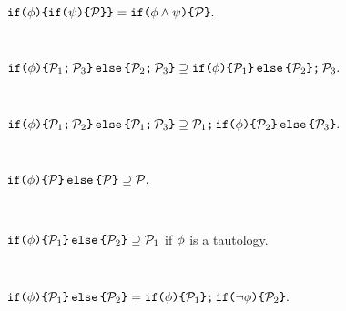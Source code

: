 \begin{lemma}
  \label{lem:if}

  \begin{enumerate*}[label=(\alph*),ref=\alph*]
    \setcounter{enumi}{3}
    \item \label{lem:if:if}
    \begin{math}
      \xIFTHEN{\aForm}{
        \xIFTHEN{\bForm}{\aPSS}{}
      }{}
      =
      \xIFTHEN{\aForm\land\bForm}{\aPSS}{}.
    \end{math}

  \\\item \label{lem:if:seq}
    \begin{math}
      \xIFTHEN{\aForm}{
        \xSEMI{\aPSS_1}{\aPSS_3}
      }{
        \xSEMI{\aPSS_2}{\aPSS_3}
      }
      \supseteq
      \xSEMI{
        \xIFTHEN{\aForm}{\aPSS_1}{\aPSS_2}
      }{
        \aPSS_3
      }.
    \end{math}

  \\\item \label{lem:seq:if}
    \begin{math}
      \xIFTHEN{\aForm}{
        \xSEMI{\aPSS_1}{\aPSS_2}
      }{
        \xSEMI{\aPSS_1}{\aPSS_3}
      }
      \supseteq
      \xSEMI{
        \aPSS_1
      }{
        \xIFTHEN{\aForm}{\aPSS_2}{\aPSS_3}
      }.
    \end{math}

  \\\item \label{lem:if:elim}
    \begin{math}
      \xIFTHEN{\aForm}{\aPSS}{\aPSS}
      \supseteq
      \aPSS.
    \end{math}

  \\\item \label{lem:if:dead}
    \begin{math}
      \xIFTHEN{\aForm}{\aPSS_1}{\aPSS_2}
      \supseteq
      \aPSS_1
    \end{math}
    if $\phi$ is a tautology.

  \\\item
    \begin{math} \label{lem:ifelse:if:if1}
      \xIFTHEN{\aForm}{\aPSS_1}{\aPSS_2}
      =
      \xSEMI{
        \xIFTHEN{\aForm}{\aPSS_1}{}
      }{
        \xIFTHEN{\lnot\aForm}{\aPSS_2}{}
      }.
    \end{math}
    

\end{enumerate*}
\end{lemma}
